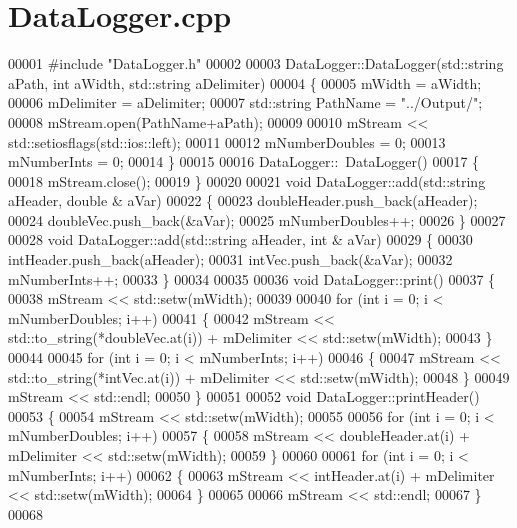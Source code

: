 \hypertarget{_data_logger_8cpp_source}{}\section{Data\+Logger.\+cpp}
\label{_data_logger_8cpp_source}

\begin{DoxyCode}
00001 \textcolor{preprocessor}{#include "DataLogger.h"}
00002 
00003 DataLogger::DataLogger(std::string aPath, \textcolor{keywordtype}{int} aWidth, std::string aDelimiter)
00004 \{
00005     mWidth = aWidth;
00006     mDelimiter = aDelimiter;
00007     std::string PathName = \textcolor{stringliteral}{"../Output/"};
00008     mStream.open(PathName+aPath);
00009 
00010     mStream << std::setiosflags(std::ios::left);
00011 
00012     mNumberDoubles = 0;
00013     mNumberInts = 0;
00014 \}
00015 
00016 DataLogger::~DataLogger()
00017 \{
00018     mStream.close();
00019 \}
00020 
00021 \textcolor{keywordtype}{void} DataLogger::add(std::string aHeader, \textcolor{keywordtype}{double} & aVar)
00022 \{
00023     doubleHeader.push\_back(aHeader);
00024     doubleVec.push\_back(&aVar);
00025     mNumberDoubles++;
00026 \}
00027 
00028 \textcolor{keywordtype}{void} DataLogger::add(std::string aHeader, \textcolor{keywordtype}{int} & aVar)
00029 \{
00030     intHeader.push\_back(aHeader);
00031     intVec.push\_back(&aVar);
00032     mNumberInts++;
00033 \}
00034 
00035 
00036 \textcolor{keywordtype}{void} DataLogger::print()
00037 \{
00038     mStream << std::setw(mWidth);
00039 
00040     \textcolor{keywordflow}{for} (\textcolor{keywordtype}{int} i = 0; i < mNumberDoubles; i++)
00041     \{
00042         mStream << std::to\_string(*doubleVec.at(i)) + mDelimiter << std::setw(mWidth);
00043     \}
00044 
00045     \textcolor{keywordflow}{for} (\textcolor{keywordtype}{int} i = 0; i < mNumberInts; i++)
00046     \{
00047         mStream << std::to\_string(*intVec.at(i)) + mDelimiter << std::setw(mWidth);
00048     \}
00049     mStream << std::endl;
00050 \}
00051 
00052 \textcolor{keywordtype}{void} DataLogger::printHeader()
00053 \{
00054     mStream << std::setw(mWidth);
00055 
00056     \textcolor{keywordflow}{for} (\textcolor{keywordtype}{int} i = 0; i < mNumberDoubles; i++)
00057     \{
00058         mStream << doubleHeader.at(i) + mDelimiter << std::setw(mWidth);
00059     \}
00060 
00061     \textcolor{keywordflow}{for} (\textcolor{keywordtype}{int} i = 0; i < mNumberInts; i++)
00062     \{
00063         mStream << intHeader.at(i) + mDelimiter << std::setw(mWidth);
00064     \}
00065 
00066     mStream << std::endl;
00067 \}
00068 
\end{DoxyCode}
